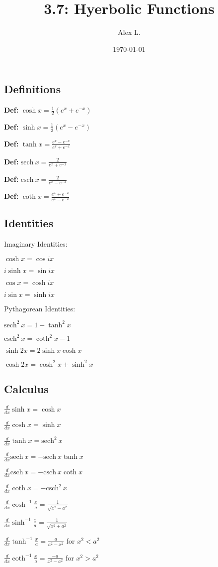 \documentclass{article}
\title{3.7: Hyerbolic Functions}
\author{Alex L.}
\date{\today}
\begin{document}
\maketitle

\subsection{Definitions}

\textbf{Def:} $\cosh x = \frac{1}{2}(e^x + e^{-x})$

\textbf{Def:} $\sinh x = \frac{1}{2}(e^x - e^{-x})$

\textbf{Def:} $\tanh x = \frac{e^x - e^{-x}}{e^x + e^{-x}}$

\textbf{Def:} $\mathrm{sech}\ x = \frac{2}{e^x + e^{-x}}$

\textbf{Def:} $\mathrm{csch}\ x = \frac{2}{e^x - e^{-x}}$

\textbf{Def:} $\coth x = \frac{e^x + e^{-x}}{e^x - e^{-x}}$

\subsection{Identities}

Imaginary Identities:

$\cosh x = \cos ix$

$i\sinh x = \sin ix$

$\cos x = \cosh ix$

$i\sin x = \sinh ix$

Pythagorean Identities:

$\mathrm{sech}^2\ x = 1-\tanh^2 x$

$\mathrm{csch}^2\ x = \coth^2 x -1$

$\sinh 2x = 2\sinh x\cosh x$

$\cosh 2x = \cosh^2x + \sinh^2 x$

\subsection{Calculus}

$\frac{d}{dx} \sinh x = \cosh x$

$\frac{d}{dx} \cosh x = \sinh x$

$\frac{d}{dx} \tanh x = \mathrm{sech}^2\ x$

$\frac{d}{dx} \mathrm{sech}\ x = -\mathrm{sech}\ x\tanh x$

$\frac{d}{dx} \mathrm{csch}\ x = -\mathrm{csch}\ x\coth x$

$\frac{d}{dx} \coth x = -\mathrm{csch}^2\ x$

$\frac{d}{dx} \cosh ^{-1} \frac{x}{a} = \frac{1}{\sqrt{x^2 - a^2}}$

$\frac{d}{dx} \sinh ^{-1} \frac{x}{a} = \frac{1}{\sqrt{x^2 + a^2}}$

$\frac{d}{dx} \tanh ^{-1} \frac{x}{a} = \frac{a}{a^2-x^2}$ for $x^2 < a^2$

$\frac{d}{dx} \coth ^{-1} \frac{x}{a} = \frac{-a}{x^2 - a^2}$ for $x^2 > a^2$
\end{document}
